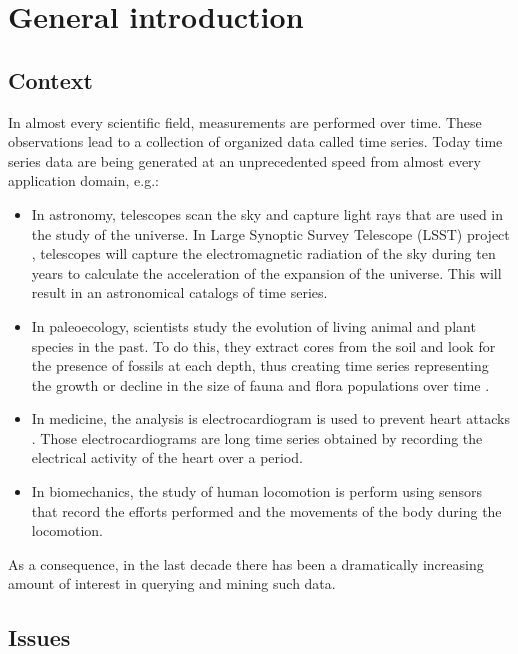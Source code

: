 \chapter*{\textbf{General introduction} }

\section*{Context}

In almost every scientific field, measurements are performed over time. These observations lead to a collection
of organized data called time series. Today time series data are being generated at an unprecedented
speed from almost every application domain, e.g.: 

\begin{itemize}
\item In astronomy, telescopes scan the sky and capture light rays that are used in the study of the universe. In Large Synoptic Survey Telescope (LSST) project \cite{lsst}, telescopes will capture the electromagnetic radiation of the sky during ten years to calculate the acceleration of the expansion of the universe. This will result in an astronomical catalogs of time series.
\item In paleoecology, scientists study the evolution of living animal and plant species in the past. To do this, they extract cores from the soil and look for the presence of fossils at each depth, thus creating time series representing the growth or decline in the size of fauna and flora populations over time \cite{lonlacfouille}. 
\item In medicine, the analysis is electrocardiogram is used to prevent heart attacks \cite{ding2011key}. Those electrocardiograms are long time series obtained by recording the electrical activity of the heart over a period.  
\item In biomechanics, the study of human locomotion is perform using sensors that record the efforts performed and the movements of the body during the locomotion.
\end{itemize}

As a consequence, in the last decade there has been a dramatically increasing amount of interest in querying and mining such data.

\section*{Issues}



